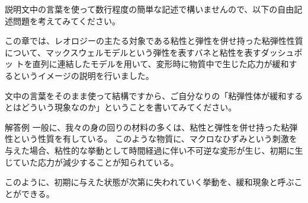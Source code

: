 \documentclass[uplatex,dvipdfmx,a4paper,11pt]{jsarticle}
\begin{document}
説明文中の言葉を使って数行程度の簡単な記述で構いませんので、以下の自由記述問題を考えてみてください。
\begin{qlist}
\qitem この章では、レオロジーの主たる対象である粘性と弾性を併せ持った粘弾性性質について、マックスウェルモデルという弾性を表すバネと粘性を表すダッシュポッ
トを直列に連結したモデルを用いて、変形時に物質中で生じた応力が緩和するというイメージの説明を行いました。

文中の言葉をそのまま使って結構ですから、ご自分なりの「粘弾性体が緩和するとはどういう現象なのか」ということを書いてみてください。
\end{qlist}

\begin{itembox}[l]{解答例}
    一般に、我々の身の回りの材料の多くは、粘性と弾性を併せ持った粘弾性という性質を有している。
	このような物質に、マクロなひずみという刺激を与えた場合、粘性的な挙動として時間経過に伴い不可逆な変形が生じ、初期に生じていた応力が減少することが知られている。

	このように、初期に与えた状態が次第に失われていく挙動を、緩和現象と呼ぶことができる。
\end{itembox}


\clearpage
\end{document}
